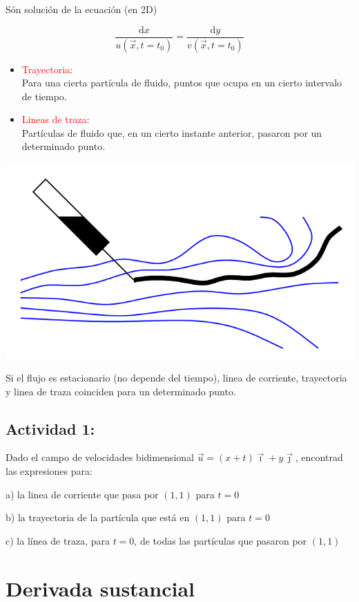 		
		Són solución de la ecuación (en 2D) 
		
		\begin{equation}
			\frac{\text{d}x}{u(\vec{x},t=t_0)}=\frac{\text{d}y}{v(\vec{x},t=t_0)}
		\end{equation}
		


	
	\begin{itemize}
		\item \textcolor{red}{Trayectoria}:\\
		Para una cierta partícula de fluido, puntos que ocupa en un cierto
		intervalo de tiempo. 
		\item \textcolor{red}{Lineas de traza}:\\
		Partículas de fluido que, en un cierto instante anterior, pasaron
		por un determinado punto.
	\end{itemize}
\begin{center}
	\includegraphics[width=0.5\linewidth]{TeX_files/chapter03-Cinematica/traza}
\end{center}


		
		Si el flujo es estacionario (no depende del tiempo), linea de corriente,
		trayectoria y linea de traza coinciden para un determinado punto. 
		



	
\subsection*{Actividad 1:}
		Dado el campo de velocidades bidimensional $\vec{u}=(x+t)\vec{\imath}+y\vec{\jmath}$,
		encontrad las expresiones para:
		
		a) la linea de corriente que pasa por $(1,1)$ para $t=0$
		
		b) la trayectoria de la partícula que está en $(1,1)$ para $t=0$
		
		c) la línea de traza, para $t=0$, de todas las partículas que pasaron
		por $(1,1)$


\section{Derivada sustancial}

